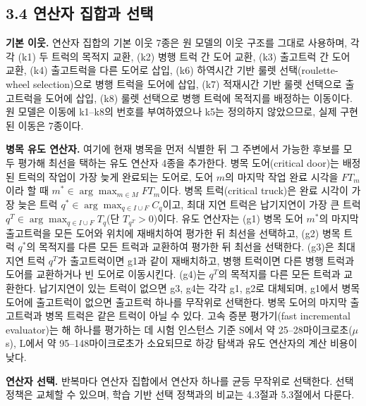 \documentclass[10pt,a4paper]{article}
\begin{document}
\subsection{3.4 연산자 집합과 선택}
\textbf{기본 이웃.} 연산자 집합의 기본 이웃 7종은 원 모델의 이웃 구조를 그대로 사용하며, 각각
(k1) 두 트럭의 목적지 교환, (k2) 병행 트럭 간 도어 교환, (k3) 출고트럭 간 도어
교환, (k4) 출고트럭을 다른 도어로 삽입, (k6) 하역시간 기반 룰렛 선택(roulette-wheel selection)으로 병행 트럭을 도어에 삽입, (k7) 적재시간 기반 룰렛 선택으로 출고트럭을 도어에 삽입,
(k8) 룰렛 선택으로 병행 트럭에 목적지를 배정하는 이동이다. 원 모델은 이동에 k1--k8의 번호를 부여하였으나 k5는 정의하지 않았으므로, 실제 구현된 이동은 7종이다.

\textbf{병목 유도 연산자.} 여기에 현재 병목을 먼저 식별한 뒤 그
주변에서 가능한 후보를 모두 평가해 최선을 택하는 유도 연산자 4종을 추가한다.
병목 도어(critical door)는 배정된 트럭의 작업이 가장 늦게 완료되는 도어로, 도어 $m$의 마지막 작업 완료 시각을
$FT_m$이라 할 때 $m^*\in\arg\max_{m\in M}FT_m$이다. 병목 트럭(critical truck)은 완료 시각이 가장 늦은 트럭
$q^*\in\arg\max_{q\in I\cup F}C_q$이고, 최대 지연 트럭은 납기지연이 가장 큰 트럭 $q^T\in\arg\max_{q\in I\cup F}T_q$(단 $T_{q^T}>0$)이다.
유도 연산자는 (g1) 병목 도어 $m^*$의 마지막 출고트럭을 모든 도어와 위치에 재배치하여 평가한 뒤 최선을 선택하고,
(g2) 병목 트럭 $q^*$의 목적지를 다른 모든 트럭과 교환하여 평가한 뒤 최선을 선택한다. (g3)은 최대 지연 트럭 $q^T$가
출고트럭이면 g1과 같이 재배치하고, 병행 트럭이면 다른 병행 트럭과 도어를 교환하거나 빈 도어로 이동시킨다.
(g4)는 $q^T$의 목적지를 다른 모든 트럭과 교환한다. 납기지연이 있는 트럭이 없으면 g3, g4는 각각 g1, g2로 대체되며,
g1에서 병목 도어에 출고트럭이 없으면 출고트럭 하나를 무작위로 선택한다. 병목 도어의 마지막 출고트럭과 병목 트럭은
같은 트럭이 아닐 수 있다. 고속 증분 평가기(fast incremental evaluator)는 해 하나를 평가하는 데 시험 인스턴스 기준 S에서 약 25--28마이크로초($\mu$s),
L에서 약 95--148마이크로초가 소요되므로 하강 탐색과 유도 연산자의 계산 비용이 낮다.

\textbf{연산자 선택.} 반복마다 연산자 집합에서 연산자 하나를 균등 무작위로 선택한다. 선택 정책은 교체할 수 있으며, 학습 기반 선택 정책과의 비교는 4.3절과 5.3절에서 다룬다.
\end{document}
